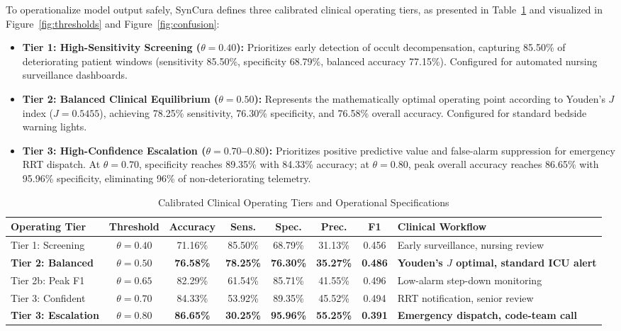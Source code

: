 \documentclass[conference]{IEEEtran}
\begin{document}
To operationalize model output safely, SynCura defines three calibrated clinical operating tiers, as presented in Table~\ref{tab:operating_tiers} and visualized in Figure~\ref{fig:thresholds} and Figure~\ref{fig:confusion}:
\begin{itemize}
    \item \textbf{Tier 1: High-Sensitivity Screening ($\theta = 0.40$):} Prioritizes early detection of occult decompensation, capturing 85.50\% of deteriorating patient windows (sensitivity 85.50\%, specificity 68.79\%, balanced accuracy 77.15\%). Configured for automated nursing surveillance dashboards.
    \item \textbf{Tier 2: Balanced Clinical Equilibrium ($\theta = 0.50$):} Represents the mathematically optimal operating point according to Youden's $J$ index ($J = 0.5455$), achieving 78.25\% sensitivity, 76.30\% specificity, and 76.58\% overall accuracy. Configured for standard bedside warning lights.
    \item \textbf{Tier 3: High-Confidence Escalation ($\theta = 0.70$--$0.80$):} Prioritizes positive predictive value and false-alarm suppression for emergency RRT dispatch. At $\theta = 0.70$, specificity reaches 89.35\% with 84.33\% accuracy; at $\theta = 0.80$, peak overall accuracy reaches 86.65\% with 95.96\% specificity, eliminating 96\% of non-deteriorating telemetry.
\end{itemize}

\begin{table}[htbp]
\caption{Calibrated Clinical Operating Tiers and Operational Specifications}
\label{tab:operating_tiers}
\centering
\footnotesize
\setlength{\tabcolsep}{3.5pt}
\begin{tabular}{lccccccp{2.3cm}}
\toprule
\textbf{Operating Tier} & \textbf{Threshold} & \textbf{Accuracy} & \textbf{Sens.} & \textbf{Spec.} & \textbf{Prec.} & \textbf{F1} & \textbf{Clinical Workflow} \\
\midrule
Tier 1: Screening & $\theta = 0.40$ & 71.16\% & 85.50\% & 68.79\% & 31.13\% & 0.456 & Early surveillance, nursing review \\
\textbf{Tier 2: Balanced} & \textbf{$\theta = 0.50$} & \textbf{76.58\%} & \textbf{78.25\%} & \textbf{76.30\%} & \textbf{35.27\%} & \textbf{0.486} & \textbf{Youden's $J$ optimal, standard ICU alert} \\
Tier 2b: Peak F1 & $\theta = 0.65$ & 82.29\% & 61.54\% & 85.71\% & 41.55\% & 0.496 & Low-alarm step-down monitoring \\
Tier 3: Confident & $\theta = 0.70$ & 84.33\% & 53.92\% & 89.35\% & 45.52\% & 0.494 & RRT notification, senior review \\
\textbf{Tier 3: Escalation} & \textbf{$\theta = 0.80$} & \textbf{86.65\%} & \textbf{30.25\%} & \textbf{95.96\%} & \textbf{55.25\%} & \textbf{0.391} & \textbf{Emergency dispatch, code-team call} \\
\bottomrule
\end{tabular}
\end{table}
\end{document}
